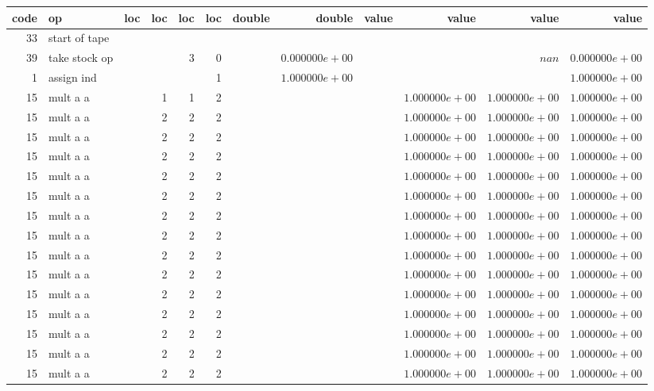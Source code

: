 \documentclass{article}
\begin{document}
\tiny
\begin{tabular}{|r|l|r|r|r|r||r|r||r|r|r|r|} \hline 
 code & op & loc & loc & loc & loc & double & double & value & value & value & value \\ \hline 
 33 & start of tape & & & & & & & & & &  \\ \hline 
39 & take stock op & & & 3 & 0 & &$ 0.000000e+00 $& & &$ nan $&$ 0.000000e+00 $\\ \hline 
1 & assign ind & & & & 1 & &$ 1.000000e+00 $& & & &$ 1.000000e+00 $\\ \hline 
15 & mult a a & & 1 & 1 & 2 & & & &$ 1.000000e+00 $&$ 1.000000e+00 $&$ 1.000000e+00 $\\ \hline 
15 & mult a a & & 2 & 2 & 2 & & & &$ 1.000000e+00 $&$ 1.000000e+00 $&$ 1.000000e+00 $\\ \hline 
15 & mult a a & & 2 & 2 & 2 & & & &$ 1.000000e+00 $&$ 1.000000e+00 $&$ 1.000000e+00 $\\ \hline 
15 & mult a a & & 2 & 2 & 2 & & & &$ 1.000000e+00 $&$ 1.000000e+00 $&$ 1.000000e+00 $\\ \hline 
15 & mult a a & & 2 & 2 & 2 & & & &$ 1.000000e+00 $&$ 1.000000e+00 $&$ 1.000000e+00 $\\ \hline 
15 & mult a a & & 2 & 2 & 2 & & & &$ 1.000000e+00 $&$ 1.000000e+00 $&$ 1.000000e+00 $\\ \hline 
15 & mult a a & & 2 & 2 & 2 & & & &$ 1.000000e+00 $&$ 1.000000e+00 $&$ 1.000000e+00 $\\ \hline 
15 & mult a a & & 2 & 2 & 2 & & & &$ 1.000000e+00 $&$ 1.000000e+00 $&$ 1.000000e+00 $\\ \hline 
15 & mult a a & & 2 & 2 & 2 & & & &$ 1.000000e+00 $&$ 1.000000e+00 $&$ 1.000000e+00 $\\ \hline 
15 & mult a a & & 2 & 2 & 2 & & & &$ 1.000000e+00 $&$ 1.000000e+00 $&$ 1.000000e+00 $\\ \hline 
15 & mult a a & & 2 & 2 & 2 & & & &$ 1.000000e+00 $&$ 1.000000e+00 $&$ 1.000000e+00 $\\ \hline 
15 & mult a a & & 2 & 2 & 2 & & & &$ 1.000000e+00 $&$ 1.000000e+00 $&$ 1.000000e+00 $\\ \hline 
15 & mult a a & & 2 & 2 & 2 & & & &$ 1.000000e+00 $&$ 1.000000e+00 $&$ 1.000000e+00 $\\ \hline 
15 & mult a a & & 2 & 2 & 2 & & & &$ 1.000000e+00 $&$ 1.000000e+00 $&$ 1.000000e+00 $\\ \hline 
15 & mult a a & & 2 & 2 & 2 & & & &$ 1.000000e+00 $&$ 1.000000e+00 $&$ 1.000000e+00 $\\ \hline 

\end{tabular}
\end{document}
